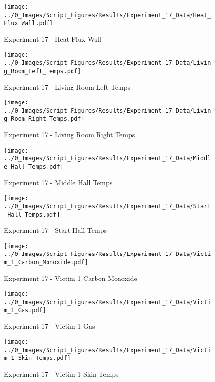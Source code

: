 	\clearpage

	\begin{figure}[H]
		\centering
		\texttt{[image: ../0\_Images/Script\_Figures/Results/Experiment\_17\_Data/Heat\_Flux\_Wall.pdf]}
		\caption[]{Experiment 17 - Heat Flux Wall}
	\end{figure}
 

	\begin{figure}[H]
		\centering
		\texttt{[image: ../0\_Images/Script\_Figures/Results/Experiment\_17\_Data/Living\_Room\_Left\_Temps.pdf]}
		\caption[]{Experiment 17 - Living Room Left Temps}
	\end{figure}
 
	\clearpage

	\begin{figure}[H]
		\centering
		\texttt{[image: ../0\_Images/Script\_Figures/Results/Experiment\_17\_Data/Living\_Room\_Right\_Temps.pdf]}
		\caption[]{Experiment 17 - Living Room Right Temps}
	\end{figure}
 

	\begin{figure}[H]
		\centering
		\texttt{[image: ../0\_Images/Script\_Figures/Results/Experiment\_17\_Data/Middle\_Hall\_Temps.pdf]}
		\caption[]{Experiment 17 - Middle Hall Temps}
	\end{figure}
 
	\clearpage

	\begin{figure}[H]
		\centering
		\texttt{[image: ../0\_Images/Script\_Figures/Results/Experiment\_17\_Data/Start\_Hall\_Temps.pdf]}
		\caption[]{Experiment 17 - Start Hall Temps}
	\end{figure}
 

	\begin{figure}[H]
		\centering
		\texttt{[image: ../0\_Images/Script\_Figures/Results/Experiment\_17\_Data/Victim\_1\_Carbon\_Monoxide.pdf]}
		\caption[]{Experiment 17 - Victim 1 Carbon Monoxide}
	\end{figure}
 
	\clearpage

	\begin{figure}[H]
		\centering
		\texttt{[image: ../0\_Images/Script\_Figures/Results/Experiment\_17\_Data/Victim\_1\_Gas.pdf]}
		\caption[]{Experiment 17 - Victim 1 Gas}
	\end{figure}
 

	\begin{figure}[H]
		\centering
		\texttt{[image: ../0\_Images/Script\_Figures/Results/Experiment\_17\_Data/Victim\_1\_Skin\_Temps.pdf]}
		\caption[]{Experiment 17 - Victim 1 Skin Temps}
	\end{figure}
 
